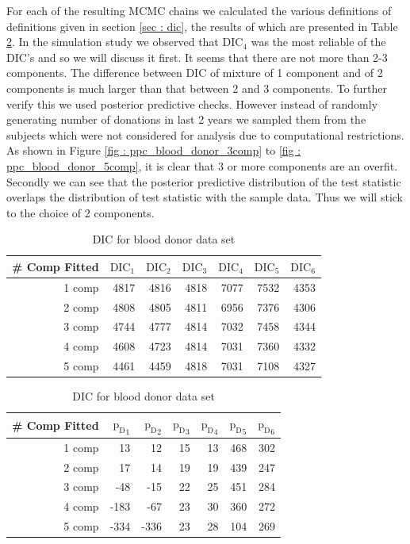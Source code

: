 For each of the resulting MCMC chains we calculated the various definitions of definitions given in section \ref{sec : dic}, the results of which are presented in Table \ref{table : dic_blood_donor}. In the simulation study we observed that $\text{DIC}_4$ was the most reliable of the DIC's and so we will discuss it first. It seems that there are not more than 2-3 components. The difference between DIC of mixture of 1 component and of 2 components is much larger than that between 2 and 3 components. To further verify this we used posterior predictive checks. However instead of randomly generating number of donations in last 2 years we sampled them from the subjects which were not considered for analysis due to computational restrictions. As shown in Figure \ref{fig : ppc_blood_donor_3comp} to \ref{fig : ppc_blood_donor_5comp}, it is clear that 3 or more components are an overfit. Secondly we can see that the posterior predictive distribution of the test statistic overlaps the distribution of test statistic with the sample data. Thus we will stick to the choice of 2 components.\\

\begin{table}[!htb]
\centering
\caption{DIC for blood donor data set}
\label{table : dic_blood_donor}
\begin{tabular}{@{}rrrrrrr@{}}
\toprule
\# Comp Fitted & $\text{DIC}_1$ & $\text{DIC}_2$  & $\text{DIC}_3$  & $\text{DIC}_4$  & $\text{DIC}_5$  & $\text{DIC}_6$  \\ \midrule
1 comp & 4817 & 4816 & 4818 & 7077 & 7532 & 4353 \\
2 comp & 4808 & 4805 & 4811 & 6956 & 7376 & 4306 \\
3 comp & 4744 & 4777 & 4814 & 7032 & 7458 & 4344 \\
4 comp & 4608 & 4723 & 4814 & 7031 & 7360 & 4332 \\
5 comp & 4461 & 4459 & 4818 & 7031 & 7108 & 4327 \\ \bottomrule
\end{tabular}
\begin{tabular}{@{}rrrrrrr@{}}
\toprule
\# Comp Fitted & ${\text{p}_\text{D}}_1$ & ${\text{p}_\text{D}}_2$ & ${\text{p}_\text{D}}_3$ & ${\text{p}_\text{D}}_4$ & ${\text{p}_\text{D}}_5$ & ${\text{p}_\text{D}}_6$ \\ \midrule
1 comp & 13 & 12 & 15 & 13 & 468 & 302 \\
2 comp & 17 & 14 & 19 & 19 & 439 & 247 \\
3 comp & -48 & -15 & 22 & 25 & 451 & 284 \\
4 comp & -183 & -67 & 23 & 30 & 360 & 272 \\
5 comp & -334 & -336 & 23 & 28 & 104 & 269 \\ \bottomrule
\end{tabular}
\end{table}

